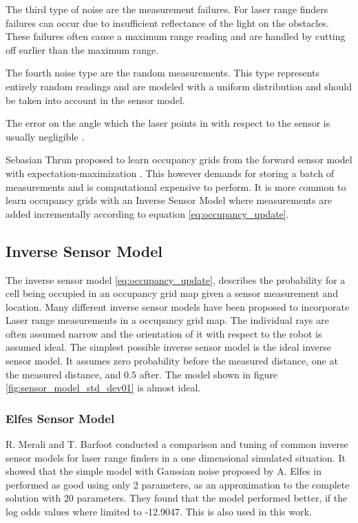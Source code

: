 The third type of noise are the measurement failures. 
For laser range finders failures can occur due to insufficient reflectance of the light on the obstacles. 
These failures often cause a maximum range reading and are handled by cutting off earlier than the maximum range.

The fourth noise type are the random measurements. This type represents entirely random readings and are modeled with a uniform distribution and should be taken into account in the sensor model.

The error on the angle which the laser points in with respect to the sensor is usually negligible \cite{probRob} .


Sebasian Thrun proposed to learn occupancy grids from the forward sensor model with expectation-maximization \cite{probRob}.
This however demands for storing a batch of measurements and is computational expensive to perform. 
It is more common to learn occupancy grids with an Inverse Sensor Model where measurements are added incrementally according to equation \vref{eq:occupancy_update}. 

\subsection{Inverse Sensor Model}
The inverse sensor model \vref{eq:occupancy_update}, describes the probability for a cell being occupied in an occupancy grid map given a sensor measurement and location.
Many different inverse sensor models have been proposed to incorporate Laser range measurements in a occupancy grid map. The individual rays are often assumed narrow and the orientation of it with respect to the robot is assumed ideal.
The simplest possible inverse sensor model is the 
ideal inverse sensor model. It assumes zero probability before the measured distance, one at the measured distance, and $0.5$ after. The model shown in figure \vref{fig:sensor_model_std_dev01} is almost ideal.

\subsubsection{Elfes Sensor Model}
R. Merali and T. Barfoot \cite{sensorModelTuning} conducted a comparison and tuning of common inverse sensor models for laser range finders in a one dimensional simulated situation. It showed that the simple model with Gaussian noise proposed by A. Elfes in \cite{elfes} performed as good using only 2 parameters, as an approximation to the complete solution with 20 parameters. They found that the model performed better, if the log odds values where limited to -12.9047. This is also used in this work.

